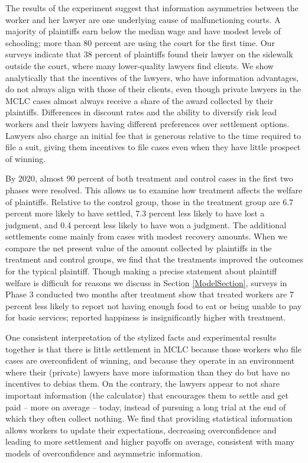 \documentclass[11pt, a4paper]{article}
\begin{document}
The results of the experiment suggest that information asymmetries between the worker and her lawyer are one underlying cause of malfunctioning courts. A majority of plaintiffs earn below the median wage and have modest levels of schooling; more than 80 percent are using the court for the first time. Our surveys indicate that 38 percent of plaintiffs found their lawyer on the sidewalk outside the court, where many lower-quality lawyers find clients. We show analytically that the incentives of the lawyers, who have information advantages, do not always align with those of their clients, even though private lawyers in the MCLC cases almost always receive a share of the award collected by their plaintiffs. Differences in discount rates and the ability to diversify risk lead workers and their lawyers having different preferences over settlement options. Lawyers also charge an initial fee that is generous relative to the time required to file a suit, giving them incentives to file cases even when they have little prospect of winning.

By 2020, almost 90 percent of both treatment and control cases in the first two phases were resolved. This allows us to examine how treatment affects the welfare of plaintiffs. Relative to the control group, those in the treatment group are 6.7 percent more likely to have settled, 7.3 percent less likely to have lost a judgment, and 0.4 percent less likely to have won a judgment. The additional settlements come mainly from cases with modest recovery amounts. When we compare the net present value of the amount collected by plaintiffs in the treatment and control groups, we find that the treatments improved the outcomes for the typical plaintiff. Though making a precise statement about plaintiff welfare is difficult for reasons we discuss in Section \ref{ModelSection}, surveys in Phase 3 conducted two months after treatment show that treated workers are 7 percent less likely to report not having enough food to eat or being unable to pay for basic services; reported happiness is insignificantly higher with treatment. 

One consistent interpretation of the stylized facts and experimental results together is that there is little settlement in MCLC because those workers who file cases are overconfident of winning, and because they operate in an environment where their (private) lawyers have more information than they do but have no incentives to debias them. On the contrary, the lawyers appear to not share important information (the calculator) that encourages them to settle and get paid -- more on average -- today, instead of pursuing a long trial at the end of which they often collect nothing. We find that providing statistical information allows workers to update their expectations, decreasing overconfidence and leading to more settlement and higher payoffs on average, consistent with many models of overconfidence and asymmetric information.
\end{document}
